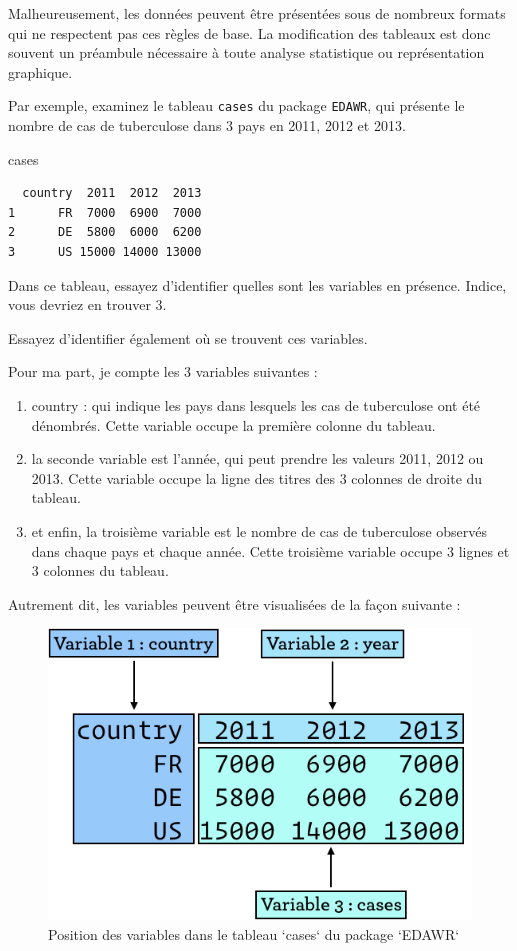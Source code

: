 \documentclass[a4paperpaper,]{article}
\newenvironment{Shaded}{\begin{snugshade}}{\end{snugshade}}
\newcommand{\NormalTok}[1]{#1}
\providecommand{\tightlist}{%
  \setlength{\itemsep}{0pt}\setlength{\parskip}{0pt}}
\theoremstyle{definition}
\theoremstyle{definition}
\theoremstyle{definition}
\theoremstyle{remark}
\begin{document}
Malheureusement, les données peuvent être présentées sous de nombreux
formats qui ne respectent pas ces règles de base. La modification des
tableaux est donc souvent un préambule nécessaire à toute analyse
statistique ou représentation graphique.

Par exemple, examinez le tableau \texttt{cases} du package
\texttt{EDAWR}, qui présente le nombre de cas de tuberculose dans 3 pays
en 2011, 2012 et 2013.

\begin{Shaded}
\begin{Highlighting}[]
\NormalTok{cases}
\end{Highlighting}
\end{Shaded}

\begin{verbatim}
  country  2011  2012  2013
1      FR  7000  6900  7000
2      DE  5800  6000  6200
3      US 15000 14000 13000
\end{verbatim}

Dans ce tableau, essayez d'identifier quelles sont les variables en
présence. Indice, vous devriez en trouver 3.

Essayez d'identifier également où se trouvent ces variables.

Pour ma part, je compte les 3 variables suivantes :

\begin{enumerate}
\def\labelenumi{\arabic{enumi}.}
\tightlist
\item
  country : qui indique les pays dans lesquels les cas de tuberculose
  ont été dénombrés. Cette variable occupe la première colonne du
  tableau.
\item
  la seconde variable est l'année, qui peut prendre les valeurs 2011,
  2012 ou 2013. Cette variable occupe la ligne des titres des 3 colonnes
  de droite du tableau.
\item
  et enfin, la troisième variable est le nombre de cas de tuberculose
  observés dans chaque pays et chaque année. Cette troisième variable
  occupe 3 lignes et 3 colonnes du tableau.
\end{enumerate}

Autrement dit, les variables peuvent être visualisées de la façon
suivante :

\begin{figure}[htpb]

{\centering \includegraphics[width=0.5\linewidth]{images/gather} 

}

\caption{Position des variables dans le tableau `cases` du package `EDAWR`}\label{fig:gather}
\end{figure}
\end{document}
